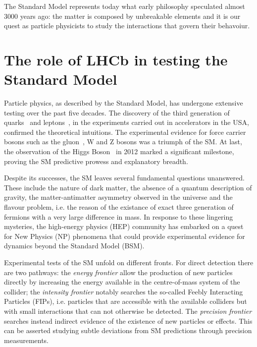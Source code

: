 The Standard Model represents today what early philosophy speculated almost 3000 years ago: the matter is composed by unbreakable elements and it is our quest as particle physicists to study the interactions that govern their behavoiur.


\section{The role of LHCb in testing the Standard Model}
Particle physics, as described by the Standard Model, has undergone extensive testing over the past five decades. The discovery of the third generation of quarks~\cite{E288:1977xhf, CDF:1995wbb} and leptons~\cite{PhysRevLett.35.1489}, in the experiments carried out in accelerators in the USA, confirmed the theoretical intuitions. The experimental evidence for force carrier bosons such as the gluon~\cite{BERGER1979449}, W and Z bosons \cite{UA1:1983mne, UA2:1983mlz} was a triumph of the SM. At last, the  observation of the Higgs Boson~\cite{Aad_2012, Chatrchyan_2012} in 2012 marked a significant milestone, proving the SM predictive prowess and explanatory breadth. 

Despite its successes, the SM leaves several fundamental questions unanswered. These include the nature of dark matter, the absence of a quantum description of gravity, the matter-antimatter asymmetry observed in the universe and the flavour problem, i.e. the reason of the existance of exact three generation of fermions with a very large difference in mass. In response to these lingering mysteries, the high-energy physics (HEP) community has embarked on a quest for New Physics (NP) phenomena that could provide experimental evidence for dynamics beyond the Standard Model (BSM). 


Experimental tests of the SM unfold on different fronts.
For direct detection there are two pathways: 
the \textit{energy frontier} allow the production of new particles directly by increasing the energy available in the centre-of-mass system of the collider; the \textit{intensity frontier} notably searches the so-called Feebly Interacting Particles (FIPs), i.e. particles that are accessible with the available colliders but with small interactions that can not otherwise be detected.  
The \textit{precision frontier} searches instead indirect evidence of the existence of new particles or effects. This can be asserted studying subtle deviations from SM predictions through precision measurements. 

